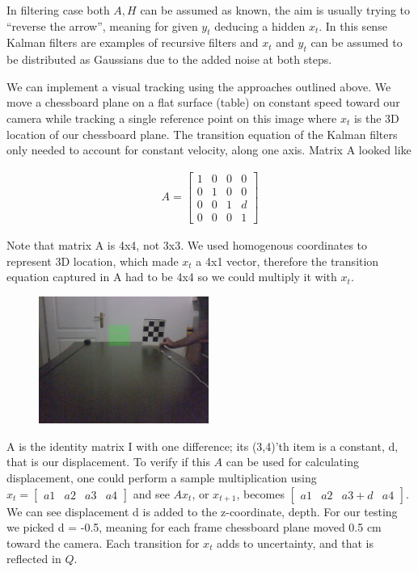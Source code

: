 \documentclass{article}
\begin{document}
In filtering case both $A,H$ can be assumed as known, the aim is usually trying
to ``reverse the arrow'', meaning for given $y_t$ deducing a hidden $x_t$. In
this sense Kalman filters are examples of recursive filters and $x_t$ and $y_t$
can be assumed to be distributed as Gaussians due to the added noise at both
steps.

We can implement a visual tracking using the approaches outlined above. We move
a chessboard plane on a flat surface (table) on constant speed toward our camera
while tracking a single reference point on this image where $x_t$ is the 3D
location of our chessboard plane. The transition equation of the Kalman filters
only needed to account for constant velocity, along one axis. Matrix A looked
like

\begin{eqnarray*}
A= \left[
\begin{array}{cccc}
1 & 0 & 0 & 0 \\
0 & 1 & 0 & 0 \\
0 & 0 & 1 & d \\
0 & 0 & 0 & 1
\end{array}
\right]
\end{eqnarray*}

Note that matrix A is 4x4, not 3x3. We used homogenous coordinates to represent
3D location, which made $x_t$ a 4x1 vector, therefore the transition equation
captured in A had to be 4x4 so we could multiply it with $x_t$.

\begin{figure}[h]
  \centering
  \includegraphics[width=15em]{kf3.jpg}
\end{figure}


A is the identity matrix I with one difference; its (3,4)'th item is a constant,
d, that is our displacement. To verify if this $A$ can be used for calculating
displacement, one could perform a sample multiplication using $x_t =
[\begin{array}{cccc}a1 & a2 & a3 & a4 \end{array}]$ and see $Ax_t$, or
$x_{t+1}$, becomes $[\begin{array}{cccc}a1 & a2 & a3+d & a4\end{array}]$. We can
see displacement d is added to the z-coordinate, depth. For our testing we
picked d = -0.5, meaning for each frame chessboard plane moved 0.5 cm toward the
camera. Each transition for $x_t$ adds to uncertainty, and that is reflected in
$Q$.
\end{document}

